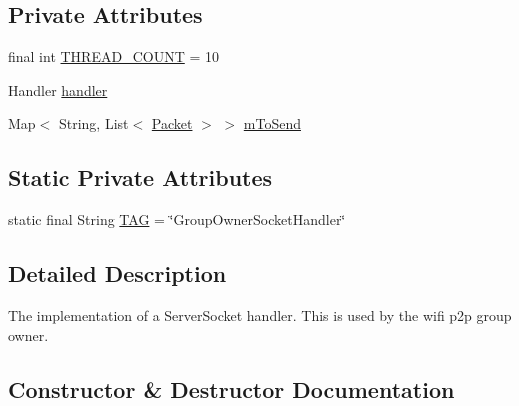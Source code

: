 \subsection*{Private Attributes}
\begin{DoxyCompactItemize}
\item 
final int \hyperlink{classcom_1_1copelabs_1_1oiframework_1_1wifi_1_1_server_thread_ab8508790f80a8cd728096ea45dab519f}{T\+H\+R\+E\+A\+D\+\_\+\+C\+O\+U\+N\+T} = 10
\item 
Handler \hyperlink{classcom_1_1copelabs_1_1oiframework_1_1wifi_1_1_server_thread_a6407a46f8c994464afa1782d2a7155ce}{handler}
\item 
Map$<$ String, List$<$ \hyperlink{classcom_1_1copelabs_1_1oiframework_1_1contentmanager_1_1_packet}{Packet} $>$ $>$ \hyperlink{classcom_1_1copelabs_1_1oiframework_1_1wifi_1_1_server_thread_a8e8d2255357f62b00ab191fe1cdd9007}{m\+To\+Send}
\end{DoxyCompactItemize}
\subsection*{Static Private Attributes}
\begin{DoxyCompactItemize}
\item 
static final String \hyperlink{classcom_1_1copelabs_1_1oiframework_1_1wifi_1_1_server_thread_a4872e5f1e5119be44722af018a51f470}{T\+A\+G} = \char`\"{}Group\+Owner\+Socket\+Handler\char`\"{}
\end{DoxyCompactItemize}


\subsection{Detailed Description}
The implementation of a Server\+Socket handler. This is used by the wifi p2p group owner. 

\subsection{Constructor \& Destructor Documentation}
\hypertarget{classcom_1_1copelabs_1_1oiframework_1_1wifi_1_1_server_thread_a2b707824c7757ea46feba5f1b2188859}{}
